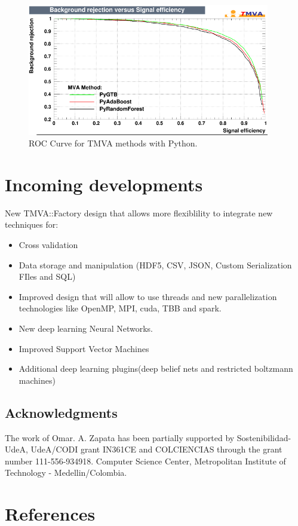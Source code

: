\documentclass[a4paper]{jpconf}
\begin{document}
\begin{figure}[h]
\centering
\includegraphics[width=25pc]{img/pymvaroc.png}\caption{\label{pymvaroc} ROC Curve for TMVA methods with Python.}
\end{figure}


\section{Incoming developments}
New TMVA::Factory design that allows more flexiblility to
integrate new techniques for:
\begin{itemize}
\item Cross validation
\item Data storage and manipulation (HDF5, CSV, JSON,
Custom Serialization FIles and SQL)
\item Improved design that will allow to use threads and new
parallelization technologies like OpenMP, MPI, cuda, TBB and spark.
\item New deep learning Neural Networks.
\item Improved Support Vector Machines 
\item  Additional deep learning plugins(deep belief nets and
restricted boltzmann machines)
\end{itemize}

\subsection{Acknowledgments}
The work of Omar. A. Zapata has been partially supported by Sostenibilidad-UdeA, UdeA/CODI grant IN361CE
and COLCIENCIAS through the grant number 111-556-934918.
Computer Science Center, Metropolitan Institute of Technology - Medellin/Colombia.




\section*{References}

\end{document}
